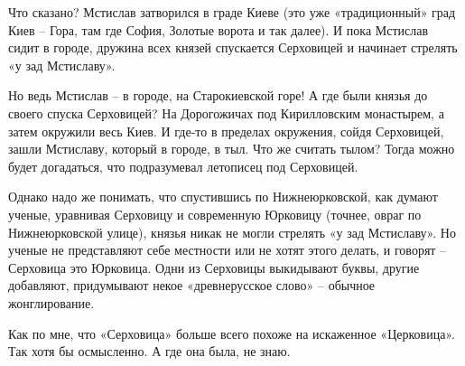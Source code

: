 Что сказано? Мстислав затворился в граде Киеве (это уже «традиционный» град Киев – Гора, там где София, Золотые ворота и так далее). И пока Мстислав сидит в городе, дружина всех князей спускается Серховицей и начинает стрелять «у зад Мстиславу».

Но ведь Мстислав – в городе, на Старокиевской горе! А где были князья до своего спуска Серховицей? На Дорогожичах под Кирилловским монастырем, а затем окружили весь Киев. И где-то в пределах окружения, сойдя Серховицей, зашли Мстиславу, который в городе, в тыл. Что же считать тылом? Тогда можно будет догадаться, что подразумевал летописец под Серховицей.

Однако надо же понимать, что спустившись по Нижнеюрковской, как думают ученые, уравнивая Серховицу и современную Юрковицу (точнее, овраг по Нижнеюрковской улице), князья никак не могли стрелять «у зад Мстиславу». Но ученые не представляют себе местности или не хотят этого делать, и говорят – Серховица это Юрковица. Одни из Серховицы выкидывают буквы, другие добавляют, придумывают некое «древнерусское слово» – обычное жонглирование. 

Как по мне, что «Серховица» больше всего похоже на искаженное «Церковица». Так хотя бы осмысленно. А где она была, не знаю.

